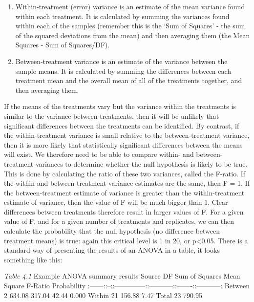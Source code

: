 \documentclass[
]{book}
\providecommand{\tightlist}{%
  \setlength{\itemsep}{0pt}\setlength{\parskip}{0pt}}
\begin{document}
\begin{enumerate}
\def\labelenumi{\arabic{enumi})}
\tightlist
\item
  Within-treatment (error) variance is an estimate of the mean variance found within each treatment. It is calculated by summing the variances found within each of the samples (remember this is the `Sum of Squares' - the sum of the squared deviations from the mean) and then averaging them (the Mean Squares - Sum of Squares/DF).
\item
  Between-treatment variance is an estimate of the variance between the sample means. It is calculated by summing the differences between each treatment mean and the overall mean of all of the treatments together, and then averaging them.
\end{enumerate}

If the means of the treatments vary but the variance within the treatments is similar to the variance between treatments, then it will be unlikely that significant differences between the treatments can be identified. By contrast, if the within-treatment variance is small relative to the between-treatment variance, then it is more likely that statistically significant differences between the means will exist. We therefore need to be able to compare within- and between- treatment variances to determine whether the null hypothesis is likely to be true. This is done by calculating the ratio of these two variances, called the F-ratio. If the within and between treatment variance estimates are the same, then F = 1. If the between-treatment estimate of variance is greater than the within-treatment estimate of variance, then the value of F will be much bigger than 1. Clear differences between treatments therefore result in larger values of F. For a given value of F, and for a given number of treatments and replicates, we can then calculate the probability that the null hypothesis (no difference between treatment means) is true: again this critical level is 1 in 20, or p\textless0.05. There is a standard way of presenting the results of an ANOVA in a table, it looks something like this:

\emph{Table 4.1} Example ANOVA summary results
\textbar{} Source \textbar{} DF \textbar{} Sum of Squares \textbar{} Mean Square \textbar{} F-Ratio \textbar{} Probability \textbar{}
\textbar:------:\textbar:--:\textbar:--------------:\textbar:-----------:\textbar:-------:\textbar:-----------:\textbar{}
\textbar{} Between \textbar{} 2 \textbar{} 634.08 \textbar{} 317.04 \textbar{} 42.44 \textbar{} 0.000 \textbar{}
\textbar{} Within \textbar{} 21 \textbar{} 156.88 \textbar{} 7.47 \textbar{}
\textbar{} Total \textbar{} 23 \textbar{} 790.95 \textbar{}
\end{document}
